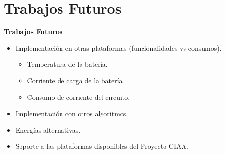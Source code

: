 \documentclass[aspectratio=43, handout]{beamer}
\begin{document}
\section{Trabajos Futuros}
\begin{frame}{\textbf{\LARGE{Trabajos Futuros}}}
\fontsize{15pt}{15}\selectfont
	\begin{itemize}
			\item Implementación en otras plataformas (funcionalidades vs consumos).
			\begin{itemize}
			\fontsize{14pt}{14}\selectfont
			\item Temperatura de la batería.
			\item Corriente de carga de la batería.
			\item Consumo de corriente del circuito.
			\end{itemize}
			\vspace{10px}
			\item Implementación con otros algoritmos.
			\vspace{10px}
			\item Energías alternativas.
			\vspace{10px}
			\item Soporte a las plataformas disponibles del Proyecto CIAA.
	\end{itemize}	  	
\end{frame}
\end{document}
